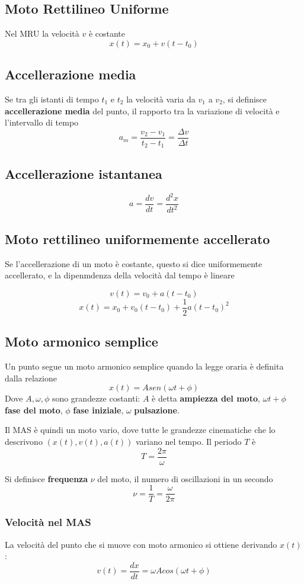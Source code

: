 \documentclass[a4paper]{report}
\begin{document}
  \subsection{Moto Rettilineo Uniforme}
  Nel MRU la velocità $v$ è costante
  \[ x(t) = x_0 + v(t-t_0)\]

  \subsection{Accellerazione media}
  Se tra gli istanti di tempo $t_1$ e $t_2$ la velocità varia da $v_1$ a $v_2$, si definisce \textbf{accellerazione media} del punto, il rapporto tra la variazione di velocità e l'intervallo di tempo
  \[ a_m = \frac{v_2-v_1}{t_2-t_1} = \frac{\Delta v}{\Delta t} \]

  \subsection{Accellerazione istantanea}
  \[ a = \frac{dv}{dt} = \frac{d^2x}{dt^2} \]

  \subsection{Moto rettilineo uniformemente accellerato}
  Se l'accellerazione di un moto è costante, questo si dice uniformemente accellerato, e la dipenmdenza della velocità dal tempo è lineare

  \[ v(t) = v_0 + a(t-t_0) \]
  \[ x(t) = x_0 + v_0(t-t_0) + \frac{1}{2} a(t-t_0)^2  \]

  \subsection{Moto armonico semplice}
  Un punto segue un moto armonico semplice quando la legge oraria è definita dalla relazione
  \[ x(t) = A sen(\omega t + \phi) \]
    Dove $A, \omega, \phi$ sono grandezze costanti: $A$ è detta \textbf{ampiezza del moto}, $\omega t + \phi$ \textbf{fase del moto}, $\phi$ \textbf{fase iniziale}, $\omega$ \textbf{pulsazione}.

    Il MAS è quindi un moto vario, dove tutte le grandezze cinematiche che lo descrivono $(x(t), v(t), a(t))$ variano nel tempo.
    Il periodo $T$ è
    \[ T = \frac{2\pi}{\omega} \]

    Si definisce \textbf{frequenza} $\nu$ del moto, il numero di oscillazioni in un secondo
    \[ \nu = \frac{1}{T}=\frac{\omega}{2\pi} \]
  \subsubsection{Velocità nel MAS}
  La velocità del punto che si muove con moto armonico si ottiene derivando $x(t)$:
  \[ v(t)=\frac{dx}{dt} = \omega A cos(\omega t + \phi) \]
\end{document}
